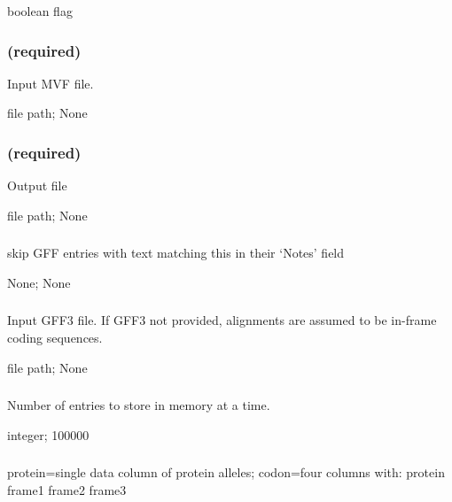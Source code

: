 \documentclass[letterpaper,11pt,english]{sphinxmanual}
\begin{document}
 boolean flag


\subsubsection{ (required)}
\label{\detokenize{prog_desc:id124}}
 Input MVF file.

 file path;  None


\subsubsection{ (required)}
\label{\detokenize{prog_desc:id125}}
 Output file

 file path;  None


\subsubsection{}
\label{\detokenize{prog_desc:id126}}
 skip GFF entries with text matching this in their ‘Notes’ field

 None;  None


\subsubsection{}
\label{\detokenize{prog_desc:id127}}
 Input GFF3 file. If GFF3 not provided, alignments are assumed to be in-frame coding sequences.

 file path;  None


\subsubsection{}
\label{\detokenize{prog_desc:id128}}
 Number of entries to store in memory at a time.

 integer;  100000


\subsubsection{}
\label{\detokenize{prog_desc:outtype}}
 protein=single data column of protein alleles; codon=four columns with: protein frame1 frame2 frame3
\end{document}
